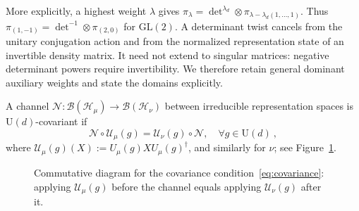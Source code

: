 \documentclass[a4paper,onecolumn,11pt]{quantumarticle}
\def\h{\mathcal{H}}
\def\map{\mathcal}
\begin{document}
More explicitly, a highest weight $\lambda$ gives
$\pi_\lambda=\det\nolimits^{\lambda_d}\otimes
\pi_{\lambda-\lambda_d(1,\ldots,1)}$. Thus
$\pi_{(1,-1)}=\det\nolimits^{-1}\otimes\pi_{(2,0)}$ for
$\mathrm{GL}(2)$. A determinant twist cancels from the unitary
conjugation action and from the normalized representation state of an
invertible density matrix. It need not extend to singular matrices:
negative determinant powers require invertibility. We therefore retain
general dominant auxiliary weights and state the domains explicitly.

A channel $\map N:\mathcal B(\h_\mu)\to\mathcal B(\h_\nu)$ between
irreducible representation spaces is $\mathrm U(d)$-covariant if
\begin{equation}\label{eq:covariance}
    \map{N}\circ\map{U}_\mu(g) = \map{U}_\nu(g)\circ\map{N},\quad\forall g\in\mathrm{U}(d)\ ,
\end{equation}
where $\map U_\mu(g)(X):=U_\mu(g)XU_\mu(g)^\dagger$, and similarly
for $\nu$; see Figure~\ref{fig:covariance_diagram}.

\begin{figure}
    \centering
    \caption{Commutative diagram for the covariance condition~\eqref{eq:covariance}: applying $\mathcal U_\mu(g)$ before the channel equals applying $\mathcal U_\nu(g)$ after it.}
    \label{fig:covariance_diagram}
\end{figure}
\end{document}
